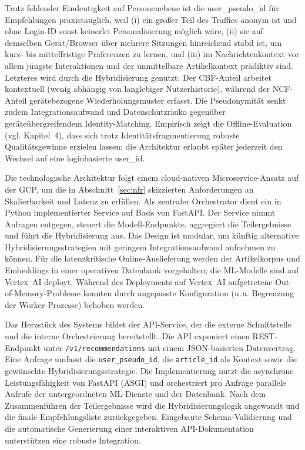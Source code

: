 Trotz fehlender Eindeutigkeit auf Personenebene ist die user\_pseudo\_id für Empfehlungen praxistauglich, weil (i) ein großer Teil des Traffics anonym ist und ohne Login-ID sonst keinerlei Personalisierung möglich wäre, (ii) sie auf demselben Gerät/Browser über mehrere Sitzungen hinreichend stabil ist, um kurz- bis mittelfristige Präferenzen zu lernen, und (iii) im Nachrichtenkontext vor allem jüngste Interaktionen und der unmittelbare Artikelkontext prädiktiv sind. Letzteres wird durch die Hybridisierung genutzt: Der CBF-Anteil arbeitet kontextuell (wenig abhängig von langlebiger Nutzerhistorie), während der NCF-Anteil gerätebezogene Wiederholungsmuster erfasst. Die Pseudonymität senkt zudem Integrationsaufwand und Datenschutzrisiko gegenüber geräteübergreifendem Identity-Matching. Empirisch zeigt die Offline-Evaluation (vgl. Kapitel~4), dass sich trotz Identitätsfragmentierung robuste Qualitätsgewinne erzielen lassen; die Architektur erlaubt später jederzeit den Wechsel auf eine loginbasierte user\_id.


Die technologische Architektur folgt einem cloud-nativen Microservice-Ansatz auf der \ac{GCP}, um die in Abschnitt~\ref{sec:nfr} skizzierten Anforderungen an Skalierbarkeit und Latenz zu erfüllen. Als zentraler Orchestrator dient ein in Python implementierter Service auf Basis von FastAPI. Der Service nimmt Anfragen entgegen, steuert die Modell-Endpunkte, aggregiert die Teilergebnisse und führt die Hybridisierung aus. Das Design ist modular, um künftig alternative Hybridisierungsstrategien mit geringem Integrationsaufwand aufnehmen zu können. Für die latenzkritische Online-Auslieferung werden der Artikelkorpus und Embeddings in einer operativen Datenbank vorgehalten; die ML-Modelle sind auf Vertex~AI deployt. Während des Deployments auf Vertex~AI aufgetretene Out-of-Memory-Probleme konnten durch angepasste Konfiguration (u.\,a. Begrenzung der Worker-Prozesse) behoben werden.

\label{sec:api_design}
Das Herzstück des Systems bildet der API-Service, der die externe Schnittstelle und die interne Orchestrierung bereitstellt. Die API exponiert einen REST-Endpunkt unter \texttt{/v1/recommendations} mit einem JSON-basierten Datenvertrag. Eine Anfrage umfasst die \texttt{user\_pseudo\_id}, die \texttt{article\_id} als Kontext sowie die gewünschte Hybridisierungsstrategie. Die Implementierung nutzt die asynchrone Leistungsfähigkeit von FastAPI (\ac{ASGI}) und orchestriert pro Anfrage parallele Aufrufe der untergeordneten ML-Dienste und der Datenbank. Nach dem Zusammenführen der Teilergebnisse wird die Hybridisierungslogik angewandt und die finale Empfehlungsliste zurückgegeben. Eingebaute Schema-Validierung und die automatische Generierung einer interaktiven API-Dokumentation unterstützen eine robuste Integration.

